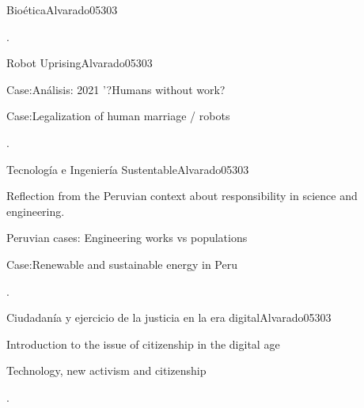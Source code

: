 \begin{syllabus}
\begin{unit}{Bioética}{}{Alvarado05}{30}{3}
   \begin{learningoutcomes}
      \item . 
   \end{learningoutcomes}
\end{unit}

\begin{unit}{Robot Uprising}{}{Alvarado05}{30}{3}
   \begin{topics}
      \item  Case:Análisis: 2021 '?Humans without work?
      \item  Case:Legalization of human marriage / robots
   \end{topics}

   \begin{learningoutcomes}
      \item .
   \end{learningoutcomes}
\end{unit}

\begin{unit}{Tecnología e Ingeniería Sustentable}{}{Alvarado05}{30}{3}
   \begin{topics}
      \item Reflection from the Peruvian context about responsibility in science and engineering.
      \item Peruvian cases: Engineering works vs populations
      \item Case:Renewable and sustainable energy in Peru
   \end{topics}

   \begin{learningoutcomes}
      \item . 
   \end{learningoutcomes}
\end{unit}

\begin{unit}{ Ciudadanía y ejercicio de la justicia en la era digital}{}{Alvarado05}{30}{3}
   \begin{topics}
      \item Introduction to the issue of citizenship in the digital age
      \item Technology, new activism and citizenship
   \end{topics}

   \begin{learningoutcomes}
      \item .
   \end{learningoutcomes}
\end{unit}


\end{syllabus}
